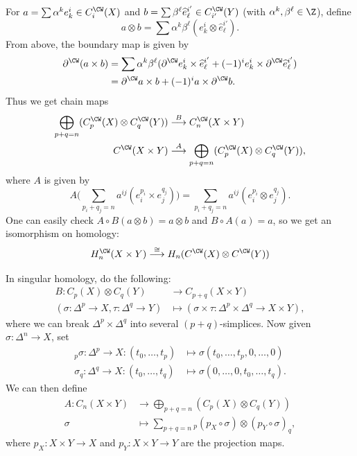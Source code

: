 \begin{remark}
  For $a = \sum \alpha^k e^i_k \in C^\CW_i(X)$ and
  $b = \sum \beta^\ell \widehat{e}^{i'}_{\ell} \in C^\CW_{i'}(Y)$ (with $\alpha^k, \beta^\ell \in \Z$),
  define
  \[
    a \otimes b = \sum \alpha^k \beta^\ell (e^i_k \otimes \widehat{e}^{i'}_{\ell}).
  \]
  From above, the boundary map
  is given by
  \begin{align*}
    \partial^\CW(a \times b)
    &= \sum \alpha^k \beta^\ell (\partial^\CW e^i_k \times \widehat{e}^{i'}_{\ell} + (-1)^i e^i_k \times \partial^\CW \widehat{e}^{i'}_{\ell}) \\
    &= \partial^\CW a \times b + (-1)^i a \times \partial^\CW b.
  \end{align*}
  Thus we get chain maps
  \begin{align*}
    \bigoplus_{p + q = n} (C^\CW_p(X) \otimes C^\CW_q(Y))
    &\overset{B}{\longrightarrow} C^\CW_n(X \times Y) \\
    C^\CW(X \times Y)
    &\overset{A}{\longrightarrow} \bigoplus_{p + q = n} (C^\CW_p(X) \otimes C^\CW_q(Y)),
  \end{align*}
  where $A$ is given by
  \[
    A\Bigg(\sum_{p_i + q_j = n} a^{ij} (e_i^{p_i} \times e_j^{q_j})\Bigg)
    = \sum_{p_i + q_j = n} a^{ij} (e_i^{p_i} \otimes e_j^{q_j}).
  \]
  One can easily check $A \circ B(a \otimes b) = a \otimes b$ and
  $B \circ A(a) = a$, so we get an isomorphism
  on homology:
  \[
    H_n^\CW(X \times Y) \overset{\cong}{\longrightarrow}
    H_n(C^\CW(X) \otimes C^\CW(Y))
  \]
\end{remark}

\begin{remark}
  In singular homology, do the following:
  \begin{align*}
    B : C_p(X) \otimes C_q(Y)
    &\longrightarrow C_{p + q}(X \times Y) \\
    (\sigma : \Delta^p \to X, \tau : \Delta^q \to Y)
    &\longmapsto (\sigma \times \tau : \Delta^{p} \times \Delta^q \to X \times Y),
  \end{align*}
  where we can break $\Delta^p \times \Delta^q$ into
  several $(p + q)$-simplices.
  Now given $\sigma : \Delta^n \to X$, set
  \begin{align*}
    {}_p\sigma : \Delta^p \to X : (t_0, \dots, t_p)
    &\longmapsto \sigma(t_0, \dots, t_p, 0, \dots, 0) \\
    \sigma_q : \Delta^q \to X : (t_0, \dots, t_q)
    &\longmapsto \sigma(0, \dots, 0, t_0, \dots, t_q).
  \end{align*}
  We can then define
  \begin{align*}
    A : C_n(X \times Y)
    &\longrightarrow \bigoplus_{p + q = n} (C_p(X) \otimes C_q(Y)) \\
    \sigma
    &\longmapsto \sum_{p + q = n} {}_p(p_X \circ \sigma) \otimes (p_Y \circ \sigma)_q,
  \end{align*}
  where $p_X : X \times Y \to X$ and $p_Y : X \times Y \to Y$ are the projection maps.
\end{remark}

